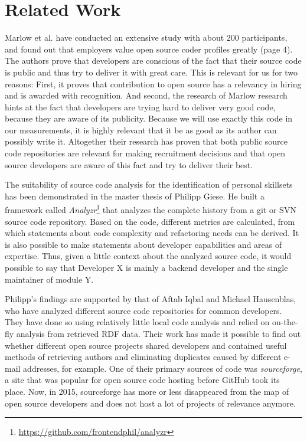\section{Related Work}
Marlow et al.\cite{md:2013} have conducted an extensive study with about
200 participants, and found out that employers value
open source coder profiles greatly (page 4). The authors prove that developers are conscious of the fact
that their source code is public and thus try to deliver it with
great care. This is relevant for us for two reasons:
First, it proves that contribution to open source has a relevancy
in hiring and is awarded with recognition. And second, the research of Marlow
research hints at the fact that developers are trying hard to deliver very
good code, because they are aware of its publicity. Because we will use
exactly this code in our measurements, it is highly relevant that it be as good as its author can possibly write it.
Altogether their research has proven that both public source code repositories
are relevant for making recruitment decisions and that open source developers
are aware of this fact and try to deliver their best.
\newline

The suitability of source code analysis for the identification of personal
skillsets has been demonstrated in the master thesis of Philipp Giese\cite{pg:2014}.
He built a framework called \textit{Analyzr}\footnote{\url{https://github.com/frontendphil/analyzr}}
that analyzes the complete history from a git or SVN source code repository.
Based on the code, different metrics are calculated, from which statements about
code complexity and refactoring needs can be derived. It is also possible
to make statements about developer capabilities and areas of expertise.
Thus, given a little context about the analyzed source code, it would possible
to say that \glqq Developer X is mainly a backend developer and the single maintainer of module Y\grqq.

Philipp's findings are supported by that of
Aftab Iqbal and Michael Hausenblas, who have analyzed different
source code repositories for common developers\cite{ih:2012}.
They have done so using relatively little local code analysis and relied
on on-the-fly analysis from retrieved RDF data. Their work
has made it possible to find out whether different open source projects shared developers
and contained useful methods of retrieving authors and eliminating duplicates
caused by different e-mail addresses, for example.
One of their primary sources of code was \textit{sourceforge}, a site that was
popular for open source code hosting before GitHub took its place.
Now, in 2015, sourceforge has more or less disappeared from the map of open
source developers and does not host a lot of projects of relevance anymore.

